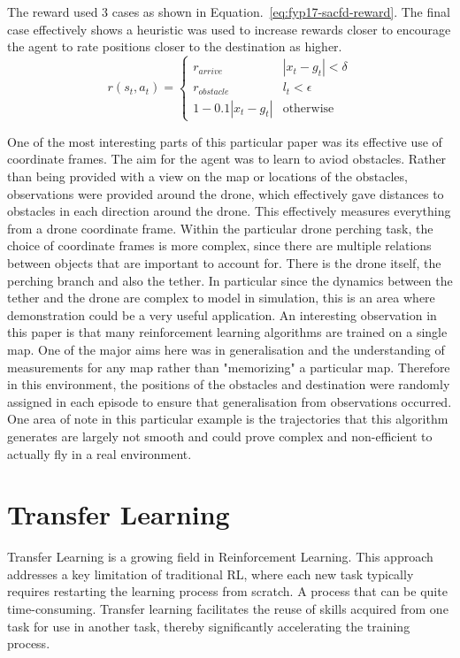 The reward used 3 cases as shown in Equation.~\ref*{eq:fyp17-sacfd-reward}. 
The final case effectively shows a heuristic was used to increase rewards closer to encourage the agent to rate positions closer to the destination as higher.
\begin{equation}
  r(s_{t}, a_{t}) =
  \begin{cases} 
    r_{arrive} & |x_{t} - g_{t}| < \delta \\
    r_{obstacle} & l_{t} < \epsilon \\
    1-0.1 |x_{t} - g_{t}| & \text{otherwise}
  \end{cases}
  \label{eq:fyp17-sacfd-reward}
\end{equation}

One of the most interesting parts of this particular paper was its effective use of coordinate frames.
The aim for the agent was to learn to aviod obstacles.
Rather than being provided with a view on the map or locations of the obstacles, observations were provided around the drone, which effectively gave distances to obstacles in each direction around the drone.
This effectively measures everything from a drone coordinate frame.
Within the particular drone perching task, the choice of coordinate frames is more complex, since there are multiple relations between objects that are important to account for.
There is the drone itself, the perching branch and also the tether.
In particular since the dynamics between the tether and the drone are complex to model in simulation, this is an area where demonstration could be a very useful application.
An interesting observation in this paper is that many reinforcement learning algorithms are trained on a single map.
One of the major aims here was in generalisation and the understanding of measurements for any map rather than "memorizing" a particular map.
Therefore in this environment, the positions of the obstacles and destination were randomly assigned in each episode to ensure that generalisation from observations occurred.
One area of note in this particular example is the trajectories that this algorithm generates are largely not smooth and could prove complex and non-efficient to actually fly in a real environment.



\section{Transfer Learning}
Transfer Learning is a growing field in Reinforcement Learning.
This approach addresses a key limitation of traditional RL, where each new task typically requires restarting the learning process from scratch.
A process that can be quite time-consuming. 
Transfer learning facilitates the reuse of skills acquired from one task for use in another task, thereby significantly accelerating the training process.

